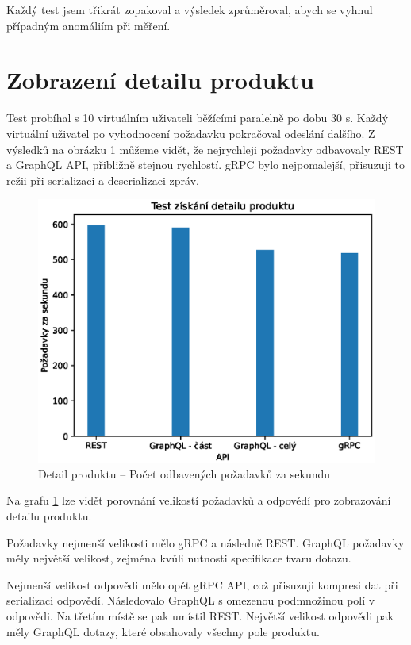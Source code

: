 \documentclass[thesis=M,czech]{FITthesis}[2019/12/23]
\begin{document}
Každý test jsem třikrát zopakoval a výsledek zprůměroval, abych se vyhnul případným anomáliím při měření.

\section{Zobrazení detailu produktu}
Test probíhal s 10 virtuálním uživateli běžícími paralelně po dobu 30 s. Každý virtuální uživatel po vyhodnocení požadavku pokračoval odeslání dalšího. Z výsledků na obrázku \ref{test_get_product} můžeme vidět, že nejrychleji požadavky odbavovaly REST a GraphQL API, přibližně stejnou rychlostí. gRPC bylo nejpomalejší, přisuzuji to režii při serializaci a deserializaci zpráv.

\begin{figure}[]
  \includegraphics[width=\linewidth]{img/get-product.eps}
  \caption{Detail produktu -- Počet odbavených požadavků za sekundu}
\label{test_get_product}
\end{figure}

Na grafu \ref{test_get_product} lze vidět porovnání velikostí požadavků a odpovědí pro zobrazování detailu produktu.

Požadavky nejmenší velikosti mělo gRPC a následně REST. GraphQL požadavky měly největší velikost, zejména kvůli nutnosti specifikace tvaru dotazu. 

Nejmenší velikost odpovědi mělo opět gRPC API, což přisuzuji kompresi dat při serializaci odpovědí. Následovalo GraphQL s omezenou podmnožinou polí v odpovědi. Na třetím místě se pak umístil REST. Největší velikost odpovědi pak měly GraphQL dotazy, které obsahovaly všechny pole produktu.
\end{document}
